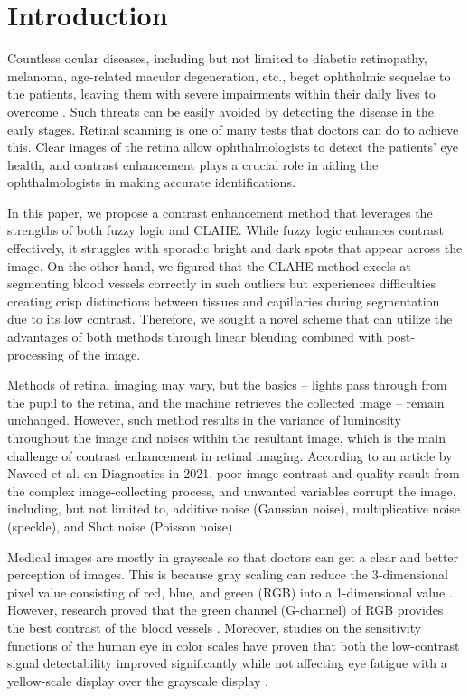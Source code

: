 \section{Introduction}
Countless ocular diseases, including but not limited to diabetic retinopathy, melanoma, age-related macular degeneration, etc., beget ophthalmic sequelae to the patients, leaving them with severe impairments within their daily lives to overcome \cite{HowRetinalImaging}. Such threats can be easily avoided by detecting the disease in the early stages.  Retinal scanning is one of many tests that doctors can do to achieve this. Clear images of the retina allow ophthalmologists to detect the patients’ eye health, and contrast enhancement plays a crucial role in aiding the ophthalmologists in making accurate identifications.

In this paper, we propose a contrast enhancement method that leverages the strengths of both fuzzy logic and CLAHE. While fuzzy logic enhances contrast effectively, it struggles with sporadic bright and dark spots that appear across the image. On the other hand, we figured that the CLAHE method excels at segmenting blood vessels correctly in such outliers but experiences difficulties creating crisp distinctions between tissues and capillaries during segmentation due to its low contrast. Therefore, we sought a novel scheme that can utilize the advantages of both methods through linear blending combined with post-processing of the image.

Methods of retinal imaging may vary, but the basics – lights pass through from the pupil to the retina, and the machine retrieves the collected image – remain unchanged. However, such method results in the variance of luminosity throughout the image and noises within the resultant image, which is the main challenge of contrast enhancement in retinal imaging.
According to an article by Naveed et al. on Diagnostics in 2021, poor image contrast and quality result from the complex image-collecting process, and unwanted variables corrupt the image, including, but not limited to, additive noise (Gaussian noise), multiplicative noise (speckle), and Shot noise (Poisson noise) \cite{naveedAutomatedEyeDiagnosis2021}.

Medical images are mostly in grayscale so that doctors can get a clear and better perception of images. This is because gray scaling can reduce the 3-dimensional pixel value consisting of red, blue, and green (RGB) into a 1-dimensional value \cite{youssefFuzzybasedImageSegmentation2021}. However, research proved that the green channel (G-channel) of RGB provides the best contrast of the blood vessels \cite{GreenChannelOverview}. Moreover, studies on the sensitivity functions of the human eye in color scales have proven that both the low-contrast signal detectability improved significantly while not affecting eye fatigue with a yellow-scale display over the grayscale display \cite{oguraComparisonGrayscaleColorscale2017}.

